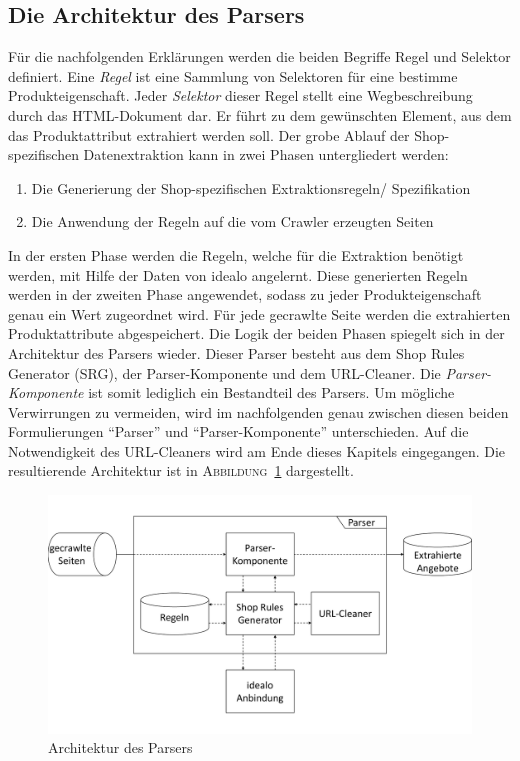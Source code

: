 \subsection{Die Architektur des Parsers}
\label{subsec:grundidee}

Für die nachfolgenden Erklärungen werden die beiden Begriffe Regel und Selektor definiert.
Eine \textit{Regel} ist eine Sammlung von Selektoren für eine bestimme Produkteigenschaft.
Jeder \textit{Selektor} dieser Regel stellt eine Wegbeschreibung durch das HTML-Dokument dar.
Er führt zu dem gewünschten Element, aus dem das Produktattribut extrahiert werden soll.
Der grobe Ablauf der Shop-spezifischen Datenextraktion kann in zwei Phasen untergliedert werden:
\begin{enumerate}
    \item Die Generierung der Shop-spezifischen Extraktionsregeln/ Spezifikation
    \item Die Anwendung der Regeln auf die vom Crawler erzeugten Seiten
\end{enumerate}

In der ersten Phase werden die Regeln, welche für die Extraktion benötigt werden, mit Hilfe der Daten von idealo
angelernt.
Diese generierten Regeln werden in der zweiten Phase angewendet, sodass zu jeder Produkteigenschaft genau ein Wert
zugeordnet wird.
Für jede gecrawlte Seite werden die extrahierten Produktattribute abgespeichert.
Die Logik der beiden Phasen spiegelt sich in der Architektur des Parsers wieder.
Dieser Parser besteht aus dem Shop Rules Generator (SRG), der Parser-Komponente und dem URL-Cleaner.
Die \emph{Parser-Komponente} ist somit lediglich ein Bestandteil des Parsers.
Um mögliche Verwirrungen zu vermeiden, wird im nachfolgenden genau zwischen diesen beiden Formulierungen ``Parser''
und ``Parser-Komponente'' unterschieden.
Auf die Notwendigkeit des URL-Cleaners wird am Ende dieses Kapitels eingegangen.
Die resultierende Architektur ist in \textsc{Abbildung}~\ref{abb:architektur-parser} dargestellt.

\begin{figure}[h]
    \centering
    \includegraphics[width=\textwidth, trim=0 1.7cm 0 1.7cm, clip]{resources/Architektur-Parser.pdf}
    \caption{Architektur des Parsers}
    \label{abb:architektur-parser}
\end{figure}


